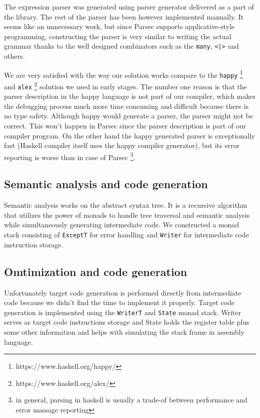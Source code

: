 \documentclass[titlepage]{article}
\begin{document}
The expression parser was generated using parser generator delivered as a part of the
library. The rest of the parser has been however implemented manually. It seems like an 
unnecessary work, but since Parsec supports applicative-style programming, 
constructing the parser is very similar to writing the actual grammar thanks to the well 
designed combinators such as the \texttt{many}, \texttt{<|>} and others.

We are very satisfied with the way our solution works compare to the \texttt{happy}
\footnote{https://www.haskell.org/happy/} \cite{happy} and \texttt{alex} 
\footnote{https://www.haskell.org/alex/} solution we used in early stages. The number one
reason is that the parser description in the happy language is not part of our 
compiler, which makes the debugging process much more time consuming and difficult
because there is no type safety. Although happy would generate a parser, the parser
might not be correct. This won't happen in Parsec since the parser description is 
part of our compiler program.
On the other hand the happy generated parser is exceptionally fast (Haskell compiler 
itself uses the happy compiler generator), but its error reporting is worse than in
case of Parsec \footnote{in general, parsing in haskell is usually a trade-of between performance
and error massage reporting}.

\subsection{Semantic analysis and code generation}
Semantic analysis works on the abstract syntax tree. It is a recursive algorithm that
utilizes the power of monads to handle tree traversal and semantic analysis while
simultaneously generating intermediate code. We constructed a monad stack consisting of
\texttt{ExceptT} for error handling and \texttt{Writer} for intermediate code instruction
storage. 

\subsection{Omtimization and code generation}
Unfortunately target code generation is performed directly from intermediate code because
we didn't find the time to implement it properly. Target code generation is implemented 
using the \texttt{WriterT} and \texttt{State} monad stack. Writer serves as target code 
instructions storage and State holds the register table plus some other information and 
helps with simulating the stack frame in assembly language. 
\end{document}
